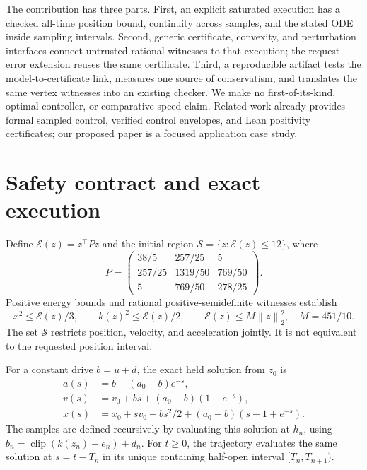 \documentclass[10pt]{article}
\newcommand{\E}{\mathcal E}
\newcommand{\clip}{\operatorname{clip}}
\newcommand{\norm}[1]{\left\lVert#1\right\rVert}
\begin{document}
The contribution has three parts. First, an explicit saturated execution has a checked all-time position bound, continuity across samples, and the stated ODE inside sampling intervals. Second, generic certificate, convexity, and perturbation interfaces connect untrusted rational witnesses to that execution; the request-error extension reuses the same certificate. Third, a reproducible artifact tests the model-to-certificate link, measures one source of conservatism, and translates the same vertex witnesses into an existing checker. We make no first-of-its-kind, optimal-controller, or comparative-speed claim. Related work already provides formal sampled control, verified control envelopes, and Lean positivity certificates; our proposed paper is a focused application case study.

\section{Safety contract and exact execution}
Define $\E(z)=z^\top Pz$ and the initial region $\mathcal S=\{z:\E(z)\le12\}$, where
\begin{equation}\label{eq:P}
 P=\begin{pmatrix}38/5&257/25&5\\257/25&1319/50&769/50\\5&769/50&278/25\end{pmatrix}.
\end{equation}
Positive energy bounds and rational positive-semidefinite witnesses establish
\begin{equation}\label{eq:geometry}
 x^2\le\E(z)/3,\qquad k(z)^2\le\E(z)/2,\qquad
 \E(z)\le M\norm{z}_2^2,\quad M=451/10.
\end{equation}
The set $\mathcal S$ restricts position, velocity, and acceleration jointly. It is not equivalent to the requested position interval.

For a constant drive $b=u+d$, the exact held solution from $z_0$ is
\begin{align}\label{eq:held}
 a(s)&=b+(a_0-b)e^{-s},\nonumber\\
 v(s)&=v_0+bs+(a_0-b)(1-e^{-s}),\\
 x(s)&=x_0+sv_0+bs^2/2+(a_0-b)(s-1+e^{-s}).\nonumber
\end{align}
The samples are defined recursively by evaluating this solution at $h_n$, using $b_n=\clip(k(z_n)+e_n)+d_n$. For $t\ge0$, the trajectory evaluates the same solution at $s=t-T_n$ in its unique containing half-open interval $[T_n,T_{n+1})$.
\end{document}
